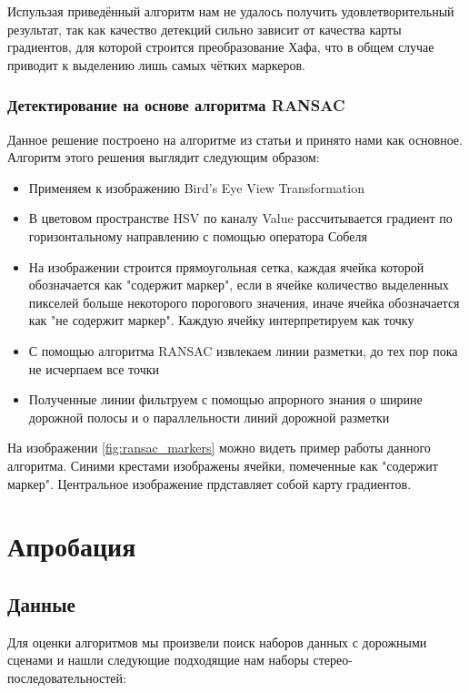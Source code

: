 \documentclass[aps,%
14pt,%
final,%
oneside,
onecolumn,%
musixtex, %
superscriptaddress,%
centertags]{extarticle} %
\begin{document}
Испульзая приведённый алгоритм нам не удалось получить удовлетворительный результат, так как качество детекций сильно зависит от качества карты градиентов, для которой строится преобразование Хафа, что в общем случае приводит к выделению лишь самых чётких маркеров.

\subsubsection*{Детектирование на основе алгоритма RANSAC}
Данное решение построено на алгоритме из статьи \cite{aly2008real} и принято нами как основное. Алгоритм этого решения выглядит следующим образом:
\begin{itemize}
    \item Применяем к изображению Bird's Eye View Transformation
    \item В цветовом пространстве HSV по каналу Value рассчитывается градиент по горизонтальному направлению с помощью оператора Собеля
    \item На изображении строится прямоугольная сетка, каждая ячейка которой обозначается как "содержит маркер", если в ячейке количество выделенных пикселей больше некоторого порогового значения, иначе ячейка обозначается как "не содержит маркер". Каждую ячейку интерпретируем как точку
    \item С помощью алгоритма RANSAC извлекаем линии разметки, до тех пор пока не исчерпаем все точки
    \item Полученные линии фильтруем с помощью апрорного знания о ширине дорожной полосы и о параллельности линий дорожной разметки
\end{itemize}

На изображении \ref{fig:ransac_markers} можно видеть пример работы данного алгоритма. Синими крестами изображены ячейки, помеченные как "содержит маркер". Центральное изображение прдставляет собой карту градиентов.

\section{Апробация}

\subsection{Данные}

Для оценки алгоритмов мы произвели поиск наборов данных с дорожными сценами и нашли следующие подходящие нам наборы стерео-последовательностей:
\end{document}
